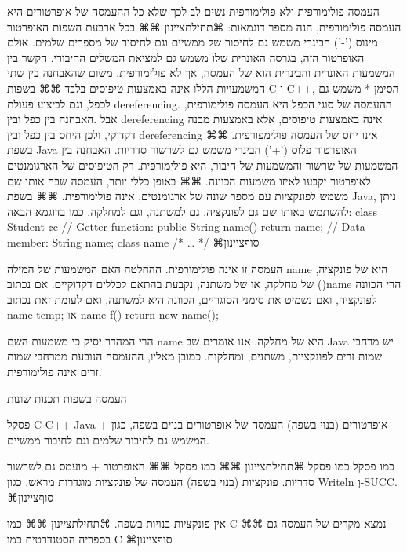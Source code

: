       העמסה פולימורפית ולא פולימורפית
      נשים לב לכך שלא כל ההעמסה של אופרטורים היא העמסה פולימורפית, הנה מספר דוגמאות:
      ⌘תחילת{ציינון}
      ⌘⌘ בכל ארבעת השפות האופרטור מינוס ('-') הבינרי משמש גם לחיסור של ממשיים וגם לחיסור של מספרים שלמים. אולם האופרטור הזה, בגרסה האונרית שלו משמש גם למציאת המשלים החיבורי. הקשר בין המשמעות האונרית והבינרית הוא של העמסה, אך לא פולימורפית, משום שהאבחנה בין שתי המשמעויות הללו אינה באמצעות טיפוסים בלבד
      ⌘⌘ בשפות C וְ-C++, הסימן * משמש גם לכפל, וגם לביצוע פעולת dereferencing. ההעמסה של סוגי הכפל היא העמסה פולימורפית, אבל .האבחנה בין כפל ובין dereferencing אינה באמצעות טיפוסים, אלא באמצעות מבנה דקדוקי, ולכן היחס בין כפל ובין dereferencing אינו יחס של העמסה פולימפורפית.
      ⌘⌘ בשפת Java האופרטור פלוס ('+') הבינרי משמש גם לשרשור סדריות. האבחנה בין המשמעות של שרשור והמשמעות של חיבור, היא פולימורפית. רק הטיפוסים של הארגומנטים לאופרטור יקבעו לאיזו משמעות הכוונה.
      ⌘⌘ באופן כללי יותר, העמסה שבה אותו שם משמש לפונקציות עם מספר שונה של ארגומנטים, אינה פולימורפית.
      ⌘⌘ בשפת Java, ניתן להשתמש באותו שם גם לפונקציה, גם למשתנה, וגם למחלקה, כמו בדוגמא הבאה:
      class Student {¢¢
        // Getter function:
        public String name() { return name; }
        // Data member:
        String name;
        class name { /* … */ }
      }
  ⌘סוף{ציינון}

      העמסה זו אינה פולימורפית. ההחלטה האם המשמעות של המילה name היא של פונקציה, של מחלקה, או של משתנה, נקבעת בהתאם לכללים דקדוקיים. אם נכתוב ()name הרי הכוונה לפונקציה, ואם נשמיט את סימני הסוגריים, הכוונה היא למשתנה, ואם לעומת זאת נכתוב
      name temp;
      או
      name f() { return new name(); }

      הרי המהדר יסיק כי משמעות השם name היא של מחלקה. אנו אומרים שב Java יש מרחבי שמות זרים לפונקציות, משתנים, ומחלקות. כמובן מאליו, ההעמסה הנובעת ממרחבי שמות זרים אינה פולימורפית.

      העמסה בשפות תכנות שונות

      פסקל
      C
      C++
      Java
      אופרטורים
      (בנוי בשפה)
      העמסה של אופרטורים בנוים בשפה, כגון + המשמש גם לחיבור שלמים וגם לחיבור ממשיים.

      כמו פסקל
      כמו פסקל
      ⌘תחילת{ציינון}
      ⌘⌘ כמו פסקל
      ⌘⌘ האופרטור + מועמס גם לשרשור סדריות.
      פונקציות (בנוי בשפה)
      העמסה של פונקציות מוגדרות מראש, כגון Writeln וְ-SUCC.
  ⌘סוף{ציינון}

      אין פונקציות בנויות בשפה.
      ⌘תחילת{ציינון}
      ⌘⌘ כמו C
      ⌘⌘ נמצא מקרים של העמסה גם בספריה הסטנדרטית
      כמו C
  ⌘סוף{ציינון}

